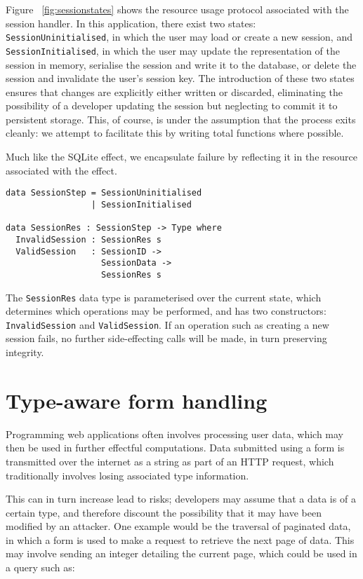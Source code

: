 \documentclass[preprint]{sigplanconf}
\begin{document}
Figure ~\ref{fig:sessionstates} shows the resource usage protocol associated with the session handler. In this application, there exist two states: \texttt{SessionUninitialised}, in which the user may load or create a new session, and \texttt{SessionInitialised}, in which the user may update the representation of the session in memory, serialise the session and write it to the database, or delete the session and invalidate the user's session key. The introduction of these two states ensures that changes are explicitly either written or discarded, eliminating the possibility of a developer updating the session but neglecting to commit it to persistent storage. This, of course, is under the assumption that the process exits cleanly: we attempt to facilitate this by writing total functions where possible.

Much like the SQLite effect, we encapsulate failure by reflecting it in the resource associated with the effect. 
\begin{Verbatim}
data SessionStep = SessionUninitialised
                 | SessionInitialised

data SessionRes : SessionStep -> Type where
  InvalidSession : SessionRes s  
  ValidSession   : SessionID -> 
                   SessionData -> 
                   SessionRes s
\end{Verbatim}
The \texttt{SessionRes} data type is parameterised over the current state, which determines which operations may be performed, and has two constructors: \texttt{InvalidSession} and \texttt{ValidSession}. If an operation such as creating a new session fails, no further side-effecting calls will be made, in turn preserving integrity. 


\section{Type-aware form handling}
\label{form}
Programming web applications often involves processing user data, which may then be used in further effectful computations. Data submitted using a form is transmitted over the internet as a string as part of an HTTP request, which traditionally involves losing associated type information.

This can in turn increase lead to risks; developers may assume that a data is of a certain type, and therefore discount the possibility that it may have been modified by an attacker. One example would be the traversal of paginated data, in which a form is used to make a request to retrieve the next page of data. This may involve sending an integer detailing the current page, which could be used in a query such as:
\end{document}
